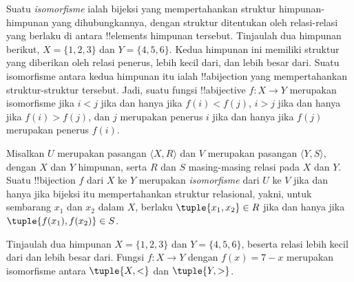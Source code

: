 \documentclass[../../../include/open-logic-section]{subfiles}
\begin{document}

\begin{explain}
Suatu \emph{isomorfisme} ialah bijeksi yang mempertahankan struktur
himpunan-himpunan yang dihubungkannya, dengan struktur ditentukan oleh
relasi-relasi yang berlaku di antara !!{element}s himpunan tersebut. Tinjaulah
dua himpunan berikut, $X=\{1,2,3\}$ dan $Y=\{4,5,6\}$. Kedua himpunan ini
memiliki struktur yang diberikan oleh relasi penerus, lebih kecil dari, dan
lebih besar dari. Suatu isomorfisme antara kedua himpunan itu ialah
!!a{bijection} yang mempertahankan struktur-struktur tersebut. Jadi, suatu
fungsi !!a{bijective} $f \colon X \to Y$ merupakan isomorfisme jika $i<j$
jika dan hanya jika $f(i)<f(j)$, $i>j$ jika dan hanya jika $f(i)>f(j)$, dan
$j$ merupakan penerus $i$ jika dan hanya jika $f(j)$ merupakan penerus
$f(i)$.
\end{explain}

\begin{defn}[Isomorfisme]
Misalkan $U$ merupakan pasangan $\langle X, R\rangle$ dan $V$ merupakan
pasangan $\langle Y, S\rangle$, dengan $X$ dan $Y$ himpunan, serta $R$ dan
$S$ masing-masing relasi pada $X$ dan $Y$. Suatu !!{bijection} $f$ dari $X$
ke $Y$ merupakan \emph{isomorfisme} dari $U$ ke $V$ jika dan hanya jika
bijeksi itu mempertahankan struktur relasional, yakni, untuk sembarang $x_{1}$ dan $x_{2}$
dalam $X$, berlaku $\tuple{x_1,x_2} \in R$ jika dan hanya jika
$\tuple{f(x_1),f(x_2)} \in S$.
\end{defn}

\begin{ex}
Tinjaulah dua himpunan $X=\{1,2,3\}$ dan $Y=\{4,5,6\}$, beserta relasi lebih
kecil dari dan lebih besar dari. Fungsi $f\colon X \to Y$ dengan
$f(x) = 7-x$ merupakan isomorfisme antara $\tuple{X,<}$ dan $\tuple{Y,>}$.
\end{ex}
\end{document}
